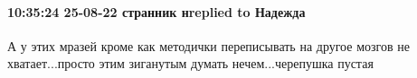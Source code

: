  
 
 
 
 

\paragraph{10:35:24 25-08-22 странник нreplied to Надежда}

А у этих мразей кроме как методички переписывать на другое мозгов не
хватает...просто этим зиганутым думать нечем...черепушка пустая
